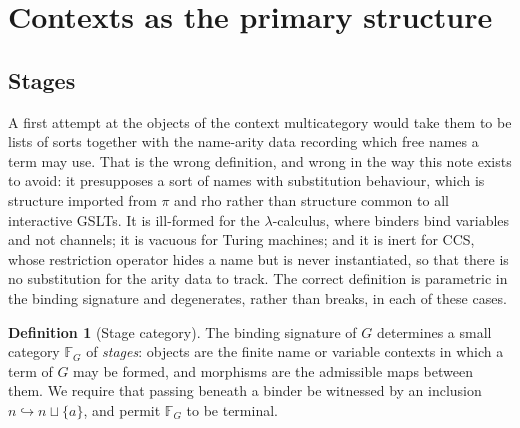 \documentclass[11pt,a4paper]{article}
\theoremstyle{definition}
\newtheorem{definition}{Definition}[section]
\theoremstyle{plain}
\theoremstyle{remark}
\begin{document}
\section{Contexts as the primary structure}
\label{sec:contexts}

\subsection{Stages}

A first attempt at the objects of the context multicategory would take them to be
lists of sorts together with the name-arity data recording which free names a term
may use. That is the wrong definition, and wrong in the way this note exists to
avoid: it presupposes a sort of names with substitution behaviour, which is
structure imported from $\pi$ and rho rather than structure common to all
interactive GSLTs. It is ill-formed for the $\lambda$-calculus, where binders bind
variables and not channels; it is vacuous for Turing machines; and it is inert for
CCS, whose restriction operator hides a name but is never instantiated, so that
there is no substitution for the arity data to track. The correct definition is
parametric in the binding signature and degenerates, rather than breaks, in each of
these cases.

\begin{definition}[Stage category]
\label{def:stage}
The binding signature of $G$ determines a small category $\mathbb{F}_G$ of
\emph{stages}: objects are the finite name or variable contexts in which a term of
$G$ may be formed, and morphisms are the admissible maps between them. We require
that passing beneath a binder be witnessed by an inclusion
$n \hookrightarrow n \sqcup \{a\}$, and permit $\mathbb{F}_G$ to be terminal.
\end{definition}
\end{document}
